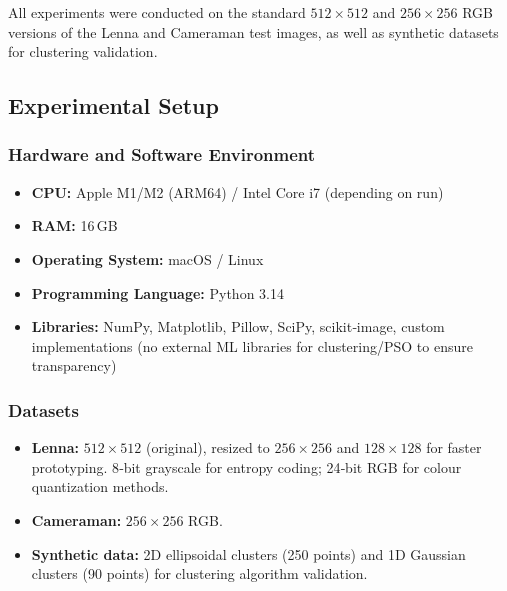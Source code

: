 All experiments were conducted on the standard $512\times512$ and $256\times256$ RGB versions of the Lenna and Cameraman test images, as well as synthetic datasets for clustering validation.

\subsection{Experimental Setup}

\subsubsection{Hardware and Software Environment}
\begin{itemize}
    \item \textbf{CPU:} Apple M1/M2 (ARM64) / Intel Core i7 (depending on run)
    \item \textbf{RAM:} 16 GB
    \item \textbf{Operating System:} macOS / Linux
    \item \textbf{Programming Language:} Python 3.14
    \item \textbf{Libraries:} NumPy, Matplotlib, Pillow, SciPy, scikit‑image, custom implementations (no external ML libraries for clustering/PSO to ensure transparency)
\end{itemize}

\subsubsection{Datasets}
\begin{itemize}
    \item \textbf{Lenna:} $512\times512$ (original), resized to $256\times256$ and $128\times128$ for faster prototyping. 8‑bit grayscale for entropy coding; 24‑bit RGB for colour quantization methods.
    \item \textbf{Cameraman:} $256\times256$ RGB.
    \item \textbf{Synthetic data:} 2D ellipsoidal clusters (250 points) and 1D Gaussian clusters (90 points) for clustering algorithm validation.
\end{itemize}

